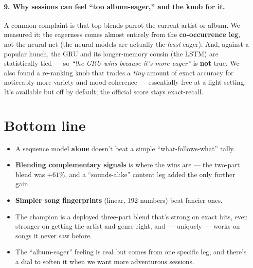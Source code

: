 \documentclass[11pt]{article}
\begin{document}
\paragraph{9. Why sessions can feel ``too album-eager,'' and the knob for it.}
A common complaint is that top blends parrot the current artist or album. We
measured it: the eagerness comes almost entirely from the \textbf{co-occurrence
leg}, not the neural net (the neural models are actually the \emph{least} eager).
And, against a popular hunch, the GRU and its longer-memory cousin (the LSTM) are
statistically tied --- so \emph{``the GRU wins because it's more eager''} is
\textbf{not} true. We also found a re-ranking knob that trades a \emph{tiny}
amount of exact accuracy for noticeably more variety and mood-coherence ---
essentially free at a light setting. It's available but off by default; the
official score stays exact-recall.

\section*{Bottom line}

\begin{itemize}
  \item A sequence model \textbf{alone} doesn't beat a simple
  ``what-follows-what'' tally.
  \item \textbf{Blending complementary signals} is where the wins are --- the
  two-part blend was $+61\%$, and a ``sounds-alike'' content leg added the only
  further gain.
  \item \textbf{Simpler song fingerprints} (linear, 192 numbers) beat fancier
  ones.
  \item The champion is a deployed three-part blend that's strong on exact hits,
  even stronger on getting the artist and genre right, and --- uniquely --- works
  on songs it never saw before.
  \item The ``album-eager'' feeling is real but comes from one specific leg, and
  there's a dial to soften it when we want more adventurous sessions.
\end{itemize}
\end{document}
